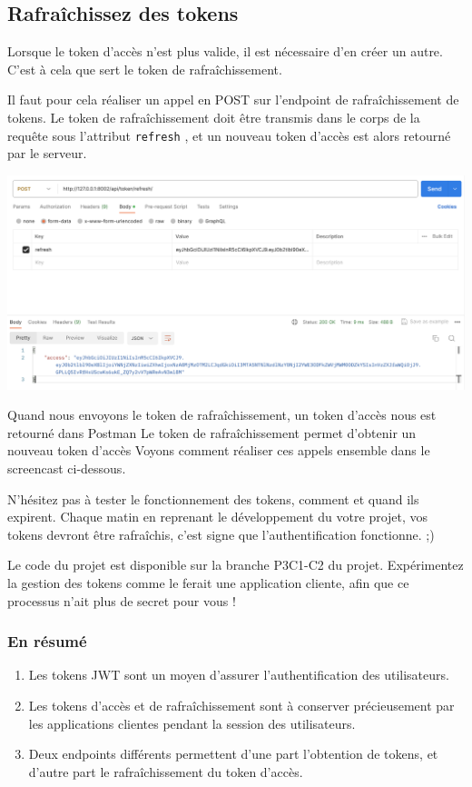 \subsection{Rafraîchissez des tokens}
Lorsque le token d’accès n’est plus valide, il est nécessaire d’en créer un autre. C’est à cela que sert le {\color{monOrange}token de rafraîchissement}.

Il faut pour cela réaliser un appel en POST sur l’endpoint de rafraîchissement de tokens. Le token de rafraîchissement doit être transmis dans le corps de la requête sous l’attribut {\tt refresh}  , et un nouveau token d’accès est alors retourné par le serveur.
\begin{center}
\includegraphics[width=15cm]{images/image26.png}
\end{center}
Quand nous envoyons le token de rafraîchissement, un token d’accès nous est retourné dans Postman
Le token de rafraîchissement permet d’obtenir un nouveau token d’accès
Voyons comment réaliser ces appels ensemble dans le screencast ci-dessous.


N’hésitez pas à tester le fonctionnement des tokens, comment et quand ils expirent. Chaque matin en reprenant le développement du votre projet, vos tokens devront être rafraîchis, c’est signe que l’authentification fonctionne. ;)

Le code du projet est disponible sur la branche P3C1-C2 du projet. Expérimentez la gestion des tokens comme le ferait une application cliente, afin que ce processus n’ait plus de secret pour vous !

\subsubsection*{En résumé}
\begin{enumerate}
\item Les tokens JWT sont un moyen d’assurer l’authentification des utilisateurs.
\item Les tokens d’accès et de rafraîchissement sont à conserver précieusement par les applications clientes pendant la session des utilisateurs.
\item Deux endpoints différents permettent d’une part l’obtention de tokens, et d’autre part le rafraîchissement du token d’accès.
\end{enumerate}

